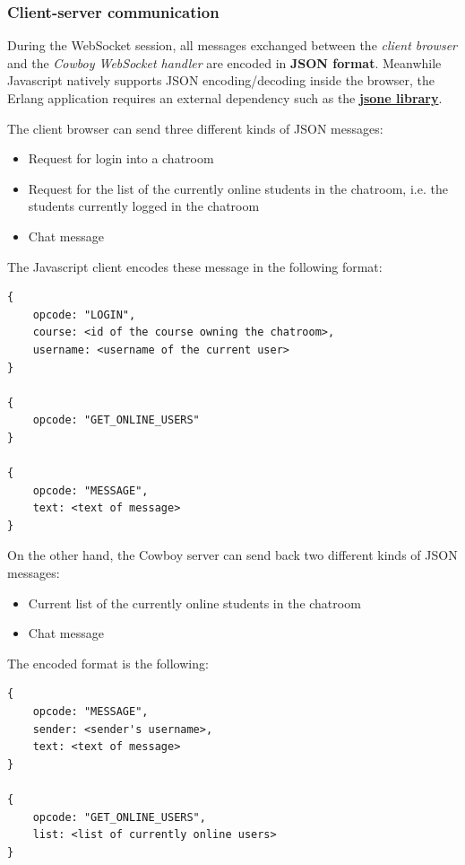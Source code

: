 \begin{sloppypar}
\subsubsection{Client-server communication}
\label{subsubsec:erlang/Client-server communication}

During the WebSocket session, all messages exchanged between the \textit{client browser} and the \textit{Cowboy WebSocket handler} are encoded in \textbf{JSON format}. Meanwhile Javascript natively supports JSON encoding/decoding inside the browser, the Erlang application requires an external dependency such as the \href{https://github.com/sile/jsone}{\textbf{jsone library}}.

The client browser can send three different kinds of JSON messages:
\begin{itemize}
    \item Request for login into a chatroom
    \item Request for the list of the currently online students in the chatroom, i.e. the students currently logged in the chatroom
    \item Chat message
\end{itemize}

The Javascript client encodes these message in the following format:
\begin{Verbatim}[samepage=true]
{
    opcode: "LOGIN",
    course: <id of the course owning the chatroom>,
    username: <username of the current user>
}

{
    opcode: "GET_ONLINE_USERS"
}

{
    opcode: "MESSAGE",
    text: <text of message>
}
\end{Verbatim}

On the other hand, the Cowboy server can send back two different kinds of JSON messages:
\begin{itemize}
    \item Current list of the currently online students in the chatroom
    \item Chat message
\end{itemize}

The encoded format is the following:
\begin{Verbatim}[samepage=true]
{
    opcode: "MESSAGE",
    sender: <sender's username>,
    text: <text of message>
}

{
    opcode: "GET_ONLINE_USERS",
    list: <list of currently online users>
}
\end{Verbatim}

\end{sloppypar}


